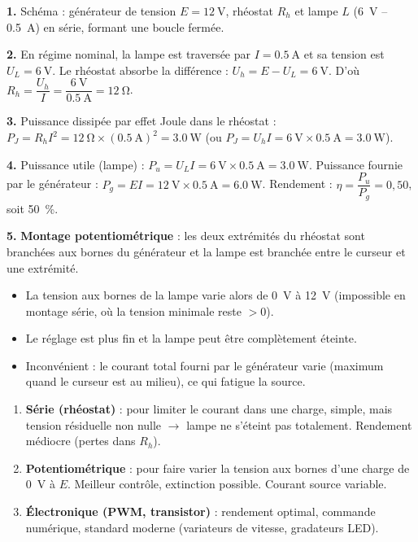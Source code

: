 \documentclass[11pt]{article}
\begin{document}
\begin{corrige}
\textbf{1.} Schéma : générateur de tension $E = \SI{12}{\volt}$, rhéostat $R_h$ et lampe $L$ (\SI{6}{\volt} -- \SI{0,5}{\ampere}) en série, formant une boucle fermée.

\textbf{2.} En régime nominal, la lampe est traversée par $I = \SI{0,5}{\ampere}$ et sa tension est $U_L = \SI{6}{\volt}$. Le rhéostat absorbe la différence : $U_h = E - U_L = \SI{6}{\volt}$. D'où $R_h = \dfrac{U_h}{I} = \dfrac{\SI{6}{\volt}}{\SI{0,5}{\ampere}} = \SI{12}{\ohm}$.

\textbf{3.} Puissance dissipée par effet Joule dans le rhéostat : $P_J = R_h I^2 = \SI{12}{\ohm} \times (\SI{0,5}{\ampere})^2 = \SI{3,0}{\watt}$ (ou $P_J = U_h I = \SI{6}{\volt} \times \SI{0,5}{\ampere} = \SI{3,0}{\watt}$).

\textbf{4.} Puissance utile (lampe) : $P_u = U_L I = \SI{6}{\volt} \times \SI{0,5}{\ampere} = \SI{3,0}{\watt}$. Puissance fournie par le générateur : $P_g = E I = \SI{12}{\volt} \times \SI{0,5}{\ampere} = \SI{6,0}{\watt}$. Rendement : $\eta = \dfrac{P_u}{P_g} = 0,50$, soit \SI{50}{\percent}.

\textbf{5.} \textbf{Montage potentiométrique} : les deux extrémités du rhéostat sont branchées aux bornes du générateur et la lampe est branchée entre le curseur et une extrémité. 
\begin{itemize}
\item La tension aux bornes de la lampe varie alors de \SI{0}{\volt} à \SI{12}{\volt} (impossible en montage série, où la tension minimale reste $>0$).
\item Le réglage est plus fin et la lampe peut être complètement éteinte.
\item Inconvénient : le courant total fourni par le générateur varie (maximum quand le curseur est au milieu), ce qui fatigue la source.
\end{itemize}
\end{corrige}

\begin{methode}
\begin{enumerate}
\item \textbf{Série (rhéostat)} : pour limiter le courant dans une charge, simple, mais tension résiduelle non nulle $\rightarrow$ lampe ne s'éteint pas totalement. Rendement médiocre (pertes dans $R_h$).
\item \textbf{Potentiométrique} : pour faire varier la tension aux bornes d'une charge de \SI{0}{\volt} à $E$. Meilleur contrôle, extinction possible. Courant source variable.
\item \textbf{Électronique (PWM, transistor)} : rendement optimal, commande numérique, standard moderne (variateurs de vitesse, gradateurs LED).
\end{enumerate}
\end{methode}
\end{document}
